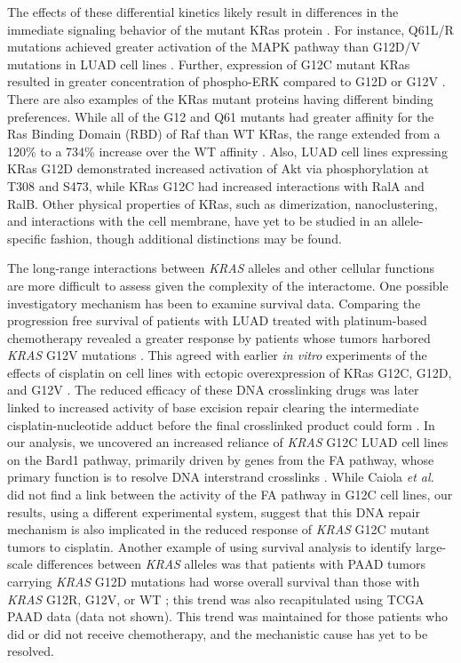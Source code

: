 \documentclass[english, 10pt, letterpaper]{article}
\newcommand{\KRAS}{\emph{KRAS}}
\newcommand{\kras}{KRas}
\begin{document}
The effects of these differential kinetics likely result in differences in the immediate signaling behavior of the mutant \kras{} protein \cite{Haigis2017, Li2018}.
For instance, Q61L/R mutations achieved greater activation of the MAPK pathway than G12D/V mutations in LUAD cell lines \cite{Pershing2015}.
Further, expression of G12C mutant \kras{} resulted in greater concentration of phospho-ERK compared to G12D or G12V \cite{Li2018AssessingCancer.}.
There are also examples of the \kras{} mutant proteins having different binding preferences.
While all of the G12 and Q61 mutants had greater affinity for the Ras Binding Domain (RBD) of Raf than WT \kras{}, the range extended from a 120\% to a 734\% increase over the WT affinity \cite{Hunter2015a}.
Also, LUAD cell lines expressing \kras{} G12D demonstrated increased activation of Akt via phosphorylation at T308 and S473, while \kras{} G12C had increased interactions with RalA and RalB.
Other physical properties of \kras{}, such as dimerization, nanoclustering, and interactions with the cell membrane, have yet to be studied in an allele-specific fashion, though additional distinctions may be found.

The long-range interactions between \KRAS{} alleles and other cellular functions are more difficult to assess given the complexity of the interactome.
One possible investigatory mechanism has been to examine survival data.
Comparing the progression free survival of patients with LUAD treated with platinum-based chemotherapy revealed a greater response by patients whose tumors harbored \KRAS{} G12V mutations \cite{Cserepes2014Subtype-specificChemotherapy., Marabese2015KRASChemotherapy.}.
This agreed with earlier \emph{in vitro} experiments of the effects of cisplatin on cell lines with ectopic overexpression of \kras{} G12C, G12D, and G12V \cite{Garassino2011DifferentCancer.}.
The reduced efficacy of these DNA crosslinking drugs was later linked to increased activity of base excision repair clearing the intermediate cisplatin-nucleotide adduct before the final crosslinked product could form \cite{Caiola2015BaseCells.}.
In our analysis, we uncovered an increased reliance of \KRAS{} G12C LUAD cell lines on the Bard1 pathway, primarily driven by genes from the FA pathway, whose primary function is to resolve DNA interstrand crosslinks \cite{Ceccaldi2016TheFunctions.}.
While Caiola \emph{et al.} did not find a link between the activity of the FA pathway in G12C cell lines, our results, using a different experimental system, suggest that this DNA repair mechanism is also implicated in the reduced response of \KRAS{} G12C mutant tumors to cisplatin.
Another example of using survival analysis to identify large-scale differences between \KRAS{} alleles was that patients with PAAD tumors carrying \KRAS{} G12D mutations had worse overall survival than those with \KRAS{} G12R, G12V, or WT \cite{Bournet2016}; this trend was also recapitulated using TCGA PAAD data (data not shown).
This trend was maintained for those patients who did or did not receive chemotherapy, and the mechanistic cause has yet to be resolved.
\end{document}
